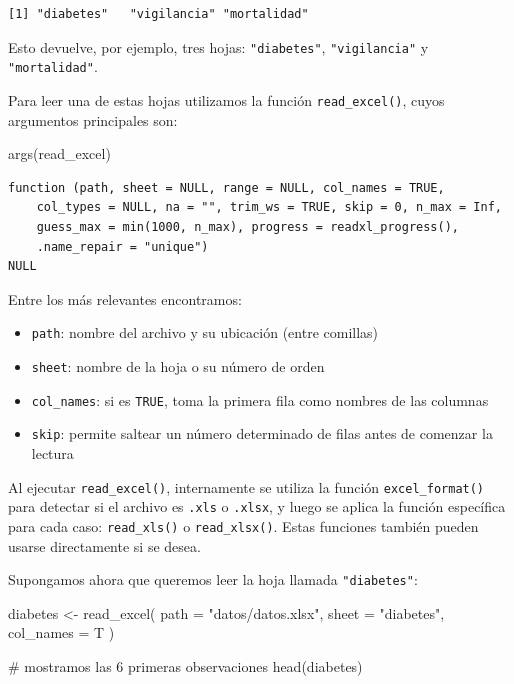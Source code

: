 \documentclass[
  spanish,
  letterpaper,
  DIV=11,
  numbers=noendperiod]{scrreprt}
\newenvironment{Shaded}{\begin{snugshade}}{\end{snugshade}}
\newcommand{\AttributeTok}[1]{\textcolor[rgb]{0.40,0.45,0.13}{#1}}
\newcommand{\CommentTok}[1]{\textcolor[rgb]{0.37,0.37,0.37}{#1}}
\newcommand{\FunctionTok}[1]{\textcolor[rgb]{0.28,0.35,0.67}{#1}}
\newcommand{\NormalTok}[1]{\textcolor[rgb]{0.00,0.23,0.31}{#1}}
\newcommand{\OtherTok}[1]{\textcolor[rgb]{0.00,0.23,0.31}{#1}}
\newcommand{\StringTok}[1]{\textcolor[rgb]{0.13,0.47,0.30}{#1}}
\begin{document}
\begin{verbatim}
[1] "diabetes"   "vigilancia" "mortalidad"
\end{verbatim}

Esto devuelve, por ejemplo, tres hojas: \texttt{"diabetes"},
\texttt{"vigilancia"} y \texttt{"mortalidad"}.

Para leer una de estas hojas utilizamos la función
\texttt{read\_excel()}, cuyos argumentos principales son:

\begin{Shaded}
\begin{Highlighting}[]
\FunctionTok{args}\NormalTok{(read\_excel)}
\end{Highlighting}
\end{Shaded}

\begin{verbatim}
function (path, sheet = NULL, range = NULL, col_names = TRUE, 
    col_types = NULL, na = "", trim_ws = TRUE, skip = 0, n_max = Inf, 
    guess_max = min(1000, n_max), progress = readxl_progress(), 
    .name_repair = "unique") 
NULL
\end{verbatim}

Entre los más relevantes encontramos:

\begin{itemize}
\item
  \texttt{path}: nombre del archivo y su ubicación (entre comillas)
\item
  \texttt{sheet}: nombre de la hoja o su número de orden
\item
  \texttt{col\_names}: si es \texttt{TRUE}, toma la primera fila como
  nombres de las columnas
\item
  \texttt{skip}: permite saltear un número determinado de filas antes de
  comenzar la lectura
\end{itemize}

Al ejecutar \texttt{read\_excel()}, internamente se utiliza la función
\texttt{excel\_format()} para detectar si el archivo es \texttt{.xls} o
\texttt{.xlsx}, y luego se aplica la función específica para cada caso:
\texttt{read\_xls()} o \texttt{read\_xlsx()}. Estas funciones también
pueden usarse directamente si se desea.

Supongamos ahora que queremos leer la hoja llamada \texttt{"diabetes"}:

\begin{Shaded}
\begin{Highlighting}[]
\NormalTok{diabetes }\OtherTok{\textless{}{-}} \FunctionTok{read\_excel}\NormalTok{(}
  \AttributeTok{path =} \StringTok{"datos/datos.xlsx"}\NormalTok{,}
  \AttributeTok{sheet =} \StringTok{"diabetes"}\NormalTok{,}
  \AttributeTok{col\_names =}\NormalTok{ T}
\NormalTok{)}

\CommentTok{\# mostramos las 6 primeras observaciones}
\FunctionTok{head}\NormalTok{(diabetes)}
\end{Highlighting}
\end{Shaded}
\end{document}
